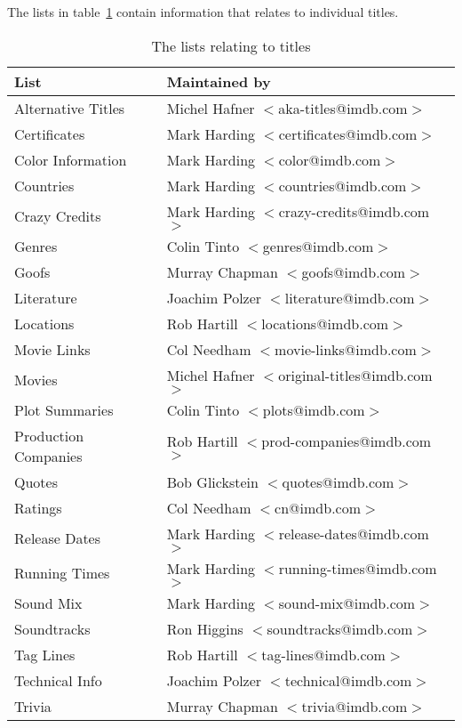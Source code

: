 The lists in table~\ref{tbl:title} contain information that relates 
to individual titles.
\begin{table}
\begin{center}
{\small
\begin{tabular}{|l|l|} \hline
List  & Maintained by  \\ \hline
Alternative Titles  & Michel Hafner $<$aka-titles@imdb.com$>$ \\ \hline
Certificates & Mark Harding $<$certificates@imdb.com$>$ \\ \hline
Color Information & Mark Harding $<$color@imdb.com$>$ \\ \hline
Countries & Mark Harding $<$countries@imdb.com$>$ \\ \hline
Crazy Credits       & Mark Harding $<$crazy-credits@imdb.com$>$ \\ \hline
Genres              & Colin Tinto $<$genres@imdb.com$>$ \\ \hline
Goofs               & Murray Chapman $<$goofs@imdb.com$>$ \\ \hline
Literature          & Joachim Polzer $<$literature@imdb.com$>$ \\ \hline
Locations           & Rob Hartill $<$locations@imdb.com$>$ \\ \hline
Movie Links         & Col Needham $<$movie-links@imdb.com$>$ \\ \hline
Movies              & Michel Hafner $<$original-titles@imdb.com$>$ \\ \hline
Plot Summaries      & Colin Tinto $<$plots@imdb.com$>$ \\ \hline
Production Companies & Rob Hartill $<$prod-companies@imdb.com$>$ \\ \hline
Quotes              & Bob Glickstein $<$quotes@imdb.com$>$ \\ \hline
Ratings             & Col Needham $<$cn@imdb.com$>$ \\ \hline
Release Dates       & Mark Harding $<$release-dates@imdb.com$>$  \\ \hline
Running Times       & Mark Harding $<$running-times@imdb.com$>$  \\ \hline
Sound Mix       & Mark Harding $<$sound-mix@imdb.com$>$  \\ \hline
Soundtracks         & Ron Higgins $<$soundtracks@imdb.com$>$ \\ \hline
Tag Lines            & Rob Hartill $<$tag-lines@imdb.com$>$ \\ \hline
Technical Info       & Joachim Polzer $<$technical@imdb.com$>$ \\ \hline
Trivia              & Murray Chapman $<$trivia@imdb.com$>$ \\ \hline
\end{tabular}}
\caption{\label{tbl:title} The lists relating to titles}
\end{center}
\end{table}

